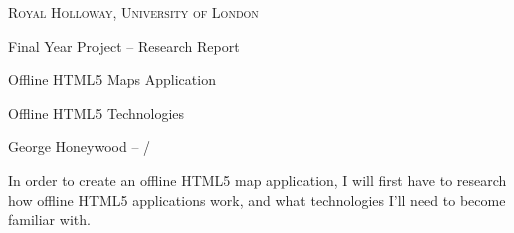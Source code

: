 \documentclass[a4paper,12pt]{report} %
\begin{document}
\begin{titlepage}
    \centering
    {\scshape\large Royal Holloway, University of London\par}
    \vspace{2cm}
    {\Huge Final Year Project -- Research Report\par}
    \vspace{0.5cm}
    {\Large Offline HTML5 Maps Application\par}
    \vspace{4cm}

    {\Huge Offline HTML5 Technologies\par}
    \vfill{}
    {\large George Honeywood -- \the\month/\the\year\par}
\end{titlepage}

\renewcommand*\contentsname{\vspace{-20pt}Contents}

\thispagestyle{fancy}






\pagestyle{fancy} %

In order to create an offline HTML5 map application, I will first have to research how offline HTML5 applications work, and what technologies I'll need to become familiar with.
\end{document}
